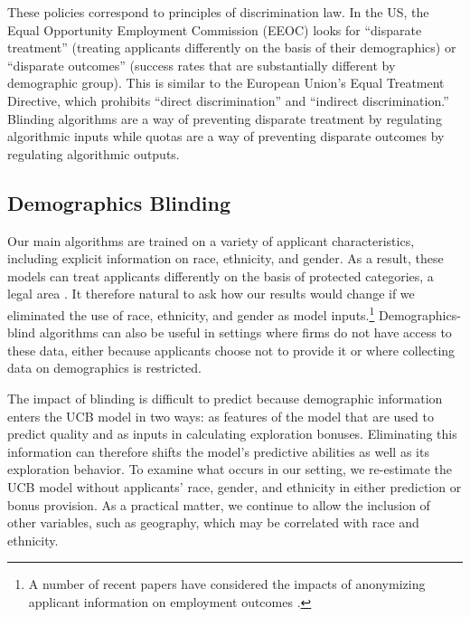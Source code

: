 \documentclass[crop,noquery,editorname,historyrev,nosurname,runningno,sepcount]{RESTUD}
\begin{document}
These policies correspond to principles of discrimination law.  In the US, the Equal Opportunity Employment Commission (EEOC) looks for ``disparate treatment'' (treating applicants differently on the basis of their demographics) or ``disparate outcomes'' (success rates that are substantially different by demographic group).  This is similar to the European Union's Equal Treatment Directive, which prohibits ``direct discrimination'' and ``indirect discrimination.''  Blinding algorithms are a way of preventing disparate treatment by regulating algorithmic inputs while quotas are a way of preventing disparate outcomes by regulating algorithmic outputs.

\subsection{Demographics Blinding} \label{sec:blinding}

Our main algorithms are trained on a variety of applicant characteristics, including explicit information on race, ethnicity, and gender.  As a result, these models can treat applicants differently on the basis of protected categories, a legal area \citep{kleinberg2018discrimination}.  It therefore natural to ask how our results would change if we eliminated the use of race, ethnicity, and gender as model inputs.\footnote{A number of recent papers have considered the impacts of anonymizing applicant information on employment outcomes \citep{goldin2000,aaslund2012,behaghel2015,agan2018,alston2019,doleac2020,craigie2020, murraygender}.}  Demographics-blind algorithms can also be useful in settings where firms do not have access to these data, either because applicants choose not to provide it or where collecting data on demographics is restricted.  

The impact of blinding is difficult to predict because demographic information enters the UCB model in two ways: as features of the model that are used to predict quality and as inputs in calculating exploration bonuses.  Eliminating this information can therefore shifts the model's predictive abilities as well as its exploration behavior.  To examine what occurs in our setting, we re-estimate the UCB model without applicants' race, gender, and ethnicity in either prediction or bonus provision.  As a practical matter, we continue to allow the inclusion of other variables, such as geography, which may be correlated with race and ethnicity.  
\end{document}
